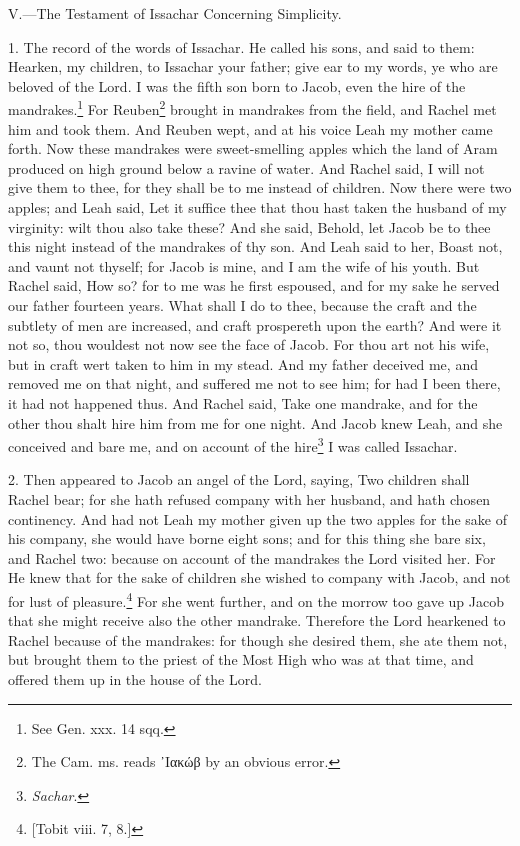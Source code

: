 
V.—The Testament of Issachar Concerning Simplicity.

1. The record of the words of Issachar. He called his sons, and said to them: Hearken, my children, to Issachar your father; give ear to my words, ye who are beloved of the Lord. I was the fifth son born to Jacob, even the hire of the mandrakes.\footnote{See Gen. xxx. 14 sqq.} For Reuben\footnote{The Cam. ms. reads \textgreek{᾽Ιακώβ} by an obvious error.} brought in mandrakes from the field, and Rachel met him and took them. And Reuben wept, and at his voice Leah my mother came forth. Now these mandrakes were sweet-smelling apples which the land of Aram produced on high ground below a ravine of water. And Rachel said, I will not give them to thee, for they shall be to me instead of children. Now there were two apples; and Leah said, Let it suffice thee that thou hast taken the husband of my virginity: wilt thou also take these? And she said, Behold, let Jacob be to thee this night instead of the mandrakes of thy son. And Leah said to her, Boast not, and vaunt not thyself; for Jacob is mine, and I am the wife of his youth. But Rachel said, How so? for to me was he first espoused, and for my sake he served our father fourteen years. What shall I do to thee, because the craft and the subtlety of men are increased, and craft prospereth upon the earth? And were it not so, thou wouldest not now see the face of Jacob. For thou art not his wife, but in craft wert taken to him in my stead. And my father deceived me, and removed me on that night, and suffered me not to see him; for had I been there, it had not happened thus. And Rachel said, Take one mandrake, and for the other thou shalt hire him from me for one night. And Jacob knew Leah, and she conceived and bare me, and on account of the hire\footnote{\emph{Sachar}.} I was called Issachar.

2. Then appeared to Jacob an angel of the Lord, saying, Two children shall Rachel bear; for she hath refused company with her husband, and hath chosen continency. And had not Leah my mother given up the two apples for the sake of his company, she would have borne eight sons; and for this thing she bare six, and Rachel two: because on account of the mandrakes the Lord visited her. For He knew that for the sake of children she wished to company with Jacob, and not for lust of pleasure.\footnote{[Tobit viii. 7, 8.]} For she went further, and on the morrow too gave up Jacob that she might receive also the other mandrake. Therefore the Lord hearkened to Rachel because of the mandrakes: for though she desired them, she ate them not, but brought them to the priest of the Most High who was at that time, and offered them up in the house of the Lord.

